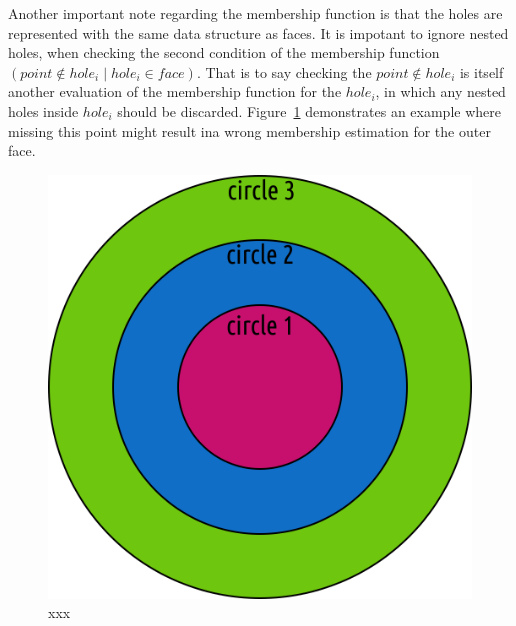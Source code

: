 Another important note regarding the membership function is that the holes are represented with the same data structure as faces.
It is impotant to ignore nested holes, when checking the second condition of the membership function $\left(point \notin hole_i \mid hole_i \in face\right)$.
That is to say checking the $point \notin hole_i$ is itself another evaluation of the membership function for the $hole_i$, in which any nested holes inside $hole_i$ should be discarded.
Figure~\ref{fig:disc_specialCase2} demonstrates an example where missing this point might result ina wrong membership estimation for the outer face.

\begin{figure} %
    \centering
    \includegraphics[width=.3\textwidth]{figures/disc_specialCase2.png}
    \caption{xxx}
    \label{fig:disc_specialCase2}
\end{figure}
